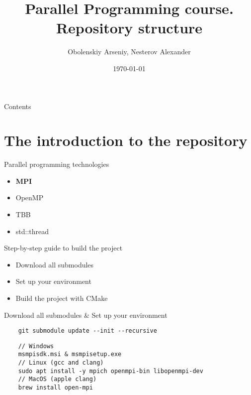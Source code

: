 \documentclass{beamer}
\title[Parallel Programming. Repository structure]{Parallel Programming course. Repository structure}
\author{Obolenskiy Arseniy, Nesterov Alexander}
\institute{Nizhny Novgorod State University}
\date{\today} %
\begin{document}
\begin{frame}
    \titlepage
\end{frame}

\begin{frame}{Contents}
    \tableofcontents
\end{frame}

\section{The introduction to the repository}

\begin{frame}[fragile]{Parallel programming technologies}
  \begin{itemize}
    \item \textbf{MPI}
    \item OpenMP
    \item TBB
    \item std::thread
  \end{itemize}
\end{frame}

\begin{frame}[fragile]{Step-by-step guide to build the project}
  \begin{itemize}
    \item Download all submodules
    \item Set up your environment
    \item Build the project with CMake
  \end{itemize}
\end{frame}

\begin{frame}[fragile]{Download all submodules \& Set up your environment}

  \lstset{style=CStyle, caption=Git submodules}
  \begin{lstlisting}
    git submodule update --init --recursive
  \end{lstlisting}

    \lstset{style=CStyle, caption=Download MPI}
  \begin{lstlisting}
    // Windows
    msmpisdk.msi & msmpisetup.exe
    // Linux (gcc and clang)
    sudo apt install -y mpich openmpi-bin libopenmpi-dev
    // MacOS (apple clang)
    brew install open-mpi
  \end{lstlisting}

\end{frame}
\end{document}
